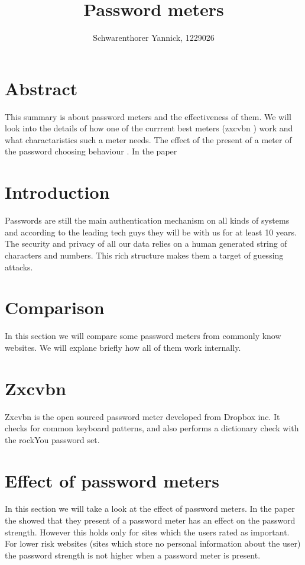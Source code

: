 \documentclass[12pt,a4paper]{article}
\author{Schwarenthorer Yannick, 1229026}
\title{Password meters}
\begin{document}
\maketitle

\section*{Abstract}
\label{sec:abstract}
This summary is about password meters and the effectiveness of them. 
We will look into the details of how one of the currrent best meters (zxcvbn \cite{zxcvbn}) work and what charactaristics such a meter needs. The effect of the present of a meter of the password choosing behaviour \cite{upToEleven}. In the paper 



\section{Introduction}
\label{sec:introduction}
Passwords are still the main authentication mechanism on all kinds of systems and according to the leading tech guys they will be with us for at least 10 years.
The security and privacy of all our data relies on a human generated string of characters and numbers.
This rich structure makes them a target of guessing attacks.



\section{Comparison}
\label{sec:Comparison}
In this section we will compare some password meters from commonly know websites. We will explane briefly how all of them work internally.



\section{Zxcvbn}
\label{sec:zxcvbn}
Zxcvbn is the open sourced password meter developed from Dropbox inc. It checks for common keyboard patterns, and also performs a dictionary check with the rockYou password set.



\section{Effect of password meters}
\label{sec:effect}
In this section we will take a look at the effect of password meters.
In the paper  \cite{upToEleven} the showed that they present of a password meter has an effect on the password strength. However this holds only for sites which the users rated as important. For lower risk websites (sites which store no personal information about the user) the password strength is not higher when a password meter is present.


\printbibliography
\end{document}
